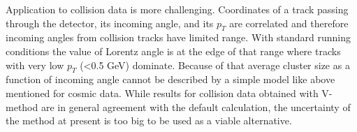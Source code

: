 Application to collision data is more challenging. Coordinates of a track passing through the detector, its incoming angle, and its $p_T$ are
correlated and therefore incoming angles from collision tracks have limited range. With
standard running conditions the value of Lorentz angle is at the edge of that range where tracks with very low $p_T$ (<0.5 GeV) dominate. Because
of that average cluster size as a function of incoming angle cannot be described by a simple model like above mentioned for cosmic data.
While  results for collision data obtained with V-method are in general agreement with the default calculation,  the uncertainty of
the method at present is too big to be used as a viable alternative.

